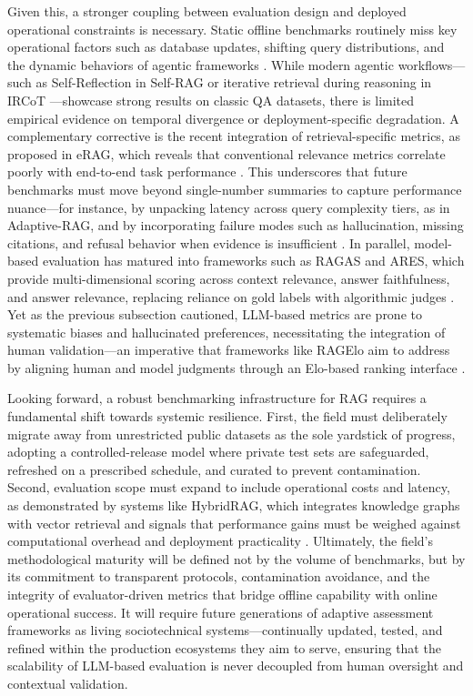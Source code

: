 \documentclass[11pt,a4paper]{article}
\begin{document}
Given this, a stronger coupling between evaluation design and deployed operational constraints is necessary. Static offline benchmarks routinely miss key operational factors such as database updates, shifting query distributions, and the dynamic behaviors of agentic frameworks \cite{arxiv:2405.07437v2}. While modern agentic workflows---such as Self-Reflection in Self-RAG \cite{arxiv:2310.11511v1} or iterative retrieval during reasoning in IRCoT \cite{arxiv:2212.10509v2}---showcase strong results on classic QA datasets, there is limited empirical evidence on temporal divergence or deployment-specific degradation. A complementary corrective is the recent integration of retrieval-specific metrics, as proposed in eRAG, which reveals that conventional relevance metrics correlate poorly with end-to-end task performance \cite{arxiv:2404.13781v1}. This underscores that future benchmarks must move beyond single-number summaries to capture performance nuance---for instance, by unpacking latency across query complexity tiers, as in Adaptive-RAG, and by incorporating failure modes such as hallucination, missing citations, and refusal behavior when evidence is insufficient \cite{arxiv:2310.11511v1}. In parallel, model-based evaluation has matured into frameworks such as RAGAS and ARES, which provide multi-dimensional scoring across context relevance, answer faithfulness, and answer relevance, replacing reliance on gold labels with algorithmic judges \cite{arxiv:2309.15217v1,arxiv:2311.09476v2}. Yet as the previous subsection cautioned, LLM-based metrics are prone to systematic biases and hallucinated preferences, necessitating the integration of human validation---an imperative that frameworks like RAGElo aim to address by aligning human and model judgments through an Elo-based ranking interface \cite{arxiv:2406.14783v1}.

Looking forward, a robust benchmarking infrastructure for RAG requires a fundamental shift towards systemic resilience. First, the field must deliberately migrate away from unrestricted public datasets as the sole yardstick of progress, adopting a controlled-release model where private test sets are safeguarded, refreshed on a prescribed schedule, and curated to prevent contamination. Second, evaluation scope must expand to include operational costs and latency, as demonstrated by systems like HybridRAG, which integrates knowledge graphs with vector retrieval and signals that performance gains must be weighed against computational overhead and deployment practicality \cite{arxiv:2408.04948v1}. Ultimately, the field's methodological maturity will be defined not by the volume of benchmarks, but by its commitment to transparent protocols, contamination avoidance, and the integrity of evaluator-driven metrics that bridge offline capability with online operational success. It will require future generations of adaptive assessment frameworks as living sociotechnical systems---continually updated, tested, and refined within the production ecosystems they aim to serve, ensuring that the scalability of LLM-based evaluation is never decoupled from human oversight and contextual validation.
\end{document}
